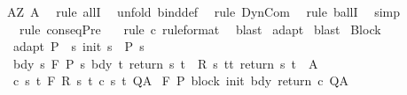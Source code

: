 \begin{isabellebody}
A{\isacharprime}{\isacharequal}{\isachardoublequoteopen}{\isasymlambda}Z{\isachardot}\ A{\isachardoublequoteclose}{\isacharbrackright}{\isacharparenright}\isanewline
{}\isamarkupfalse%
\ \ {\isacharparenleft}rule\ allI{\isacharparenright}\isanewline
{}\isamarkupfalse%
\ \ {\isacharparenleft}unfold\ bind{\isacharunderscore}def{\isacharparenright}\isanewline
{}\isamarkupfalse%
\ \ {\isacharparenleft}rule\ DynCom{\isacharparenright}\isanewline
{}\isamarkupfalse%
\ \ {\isacharparenleft}rule\ ballI{\isacharparenright}\isanewline
{}\isamarkupfalse%
\ \ simp\isanewline
{}\isamarkupfalse%
\ \ {\isacharparenleft}rule\ conseqPre{\isacharparenright}\isanewline
{}\isamarkupfalse%
\ \ \ {\isacharparenleft}rule\ c\ {\isacharbrackleft}rule{\isacharunderscore}format{\isacharbrackright}{\isacharparenright}\isanewline
{}\isamarkupfalse%
\ \ blast\isanewline
{}\isamarkupfalse%
\ adapt\isanewline
{}\isamarkupfalse%
\ blast\isanewline
{}\isamarkupfalse%
%
\endisatagproof
{\isafoldproof}%
%
\isadelimproof
\isanewline
%
\endisadelimproof
\isanewline
{}\isamarkupfalse%
\ Block{\isacharcolon}\isanewline
{}\ adapt{\isacharcolon}\ {\isachardoublequoteopen}P\ {\isasymsubseteq}\ {\isacharbraceleft}s{\isachardot}\ init\ s\ {\isasymin}\ P{\isacharprime}\ s{\isacharbraceright}{\isachardoublequoteclose}\isanewline
{}\ bdy{\isacharcolon}\ {\isachardoublequoteopen}{\isasymforall}s{\isachardot}\ {\isasymGamma}{\isacharcomma}{\isasymTheta}{\isasymturnstile}\isactrlbsub {\isacharslash}F\isactrlesub \ {\isacharparenleft}P{\isacharprime}\ s{\isacharparenright}\ bdy\ {\isacharbraceleft}t{\isachardot}\ return\ s\ t\ {\isasymin}\ R\ s\ t{\isacharbraceright}{\isacharcomma}{\isacharbraceleft}t{\isachardot}\ return\ s\ t\ {\isasymin}\ A{\isacharbraceright}{\isachardoublequoteclose}\isanewline
{}\ c{\isacharcolon}\ {\isachardoublequoteopen}{\isasymforall}s\ t{\isachardot}\ {\isasymGamma}{\isacharcomma}{\isasymTheta}{\isasymturnstile}\isactrlbsub {\isacharslash}F\isactrlesub \ {\isacharparenleft}R\ s\ t{\isacharparenright}\ {\isacharparenleft}c\ s\ t{\isacharparenright}\ Q{\isacharcomma}A{\isachardoublequoteclose}\isanewline
{}\ {\isachardoublequoteopen}{\isasymGamma}{\isacharcomma}{\isasymTheta}{\isasymturnstile}\isactrlbsub {\isacharslash}F\isactrlesub \ P\ {\isacharparenleft}block\ init\ bdy\ return\ c{\isacharparenright}\ Q{\isacharcomma}A{\isachardoublequoteclose}\ \isanewline

\end{isabellebody}
